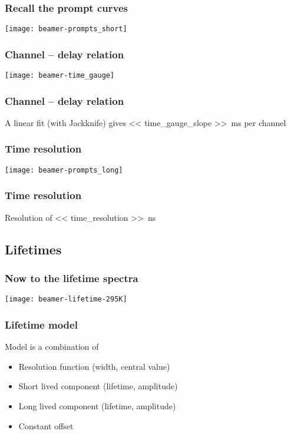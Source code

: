 \documentclass[english, fleqn]{beamer}
\begin{document}
\begin{frame}
    \frametitle{Recall the prompt curves}

    \centering
    \texttt{[image: beamer-prompts\_short]}
\end{frame}

\begin{frame}
    \frametitle{Channel -- delay relation}

    \centering
    \texttt{[image: beamer-time\_gauge]}
\end{frame}

\begin{frame}
    \frametitle{Channel -- delay relation}

    A linear fit (with Jackknife) gives
    \SI{<< time_gauge_slope >>}{\milli\second} per channel
\end{frame}


\begin{frame}
    \frametitle{Time resolution}

    \centering
    \texttt{[image: beamer-prompts\_long]}
\end{frame}

\begin{frame}
    \frametitle{Time resolution}

    Resolution of \SI{<< time_resolution >>}{\nano\second}
\end{frame}

\subsection{Lifetimes}

\begin{frame}
    \frametitle{Now to the lifetime spectra}
    
    \centering
    \texttt{[image: beamer-lifetime-295K]}
\end{frame}

\begin{frame}
    \frametitle{Lifetime model}

    Model is a combination of
    \begin{itemize}
        \item Resolution function (width, central value)
        \item Short lived component (lifetime, amplitude)
        \item Long lived component (lifetime, amplitude)
        \item Constant offset
    \end{itemize}
\end{frame}
\end{document}
